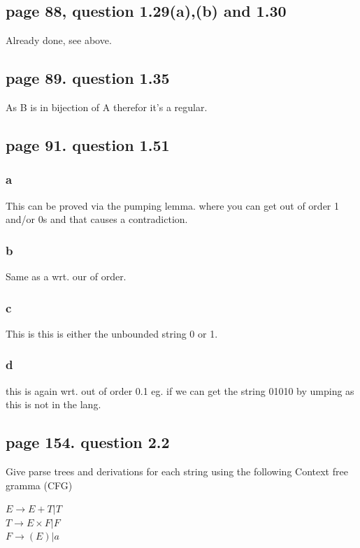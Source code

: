 \documentclass[a4paper,10pt,titlepage]{report}
\begin{document}
\subsection{page 88, question 1.29(a),(b) and 1.30}

Already done, see above.

\subsection{page 89. question 1.35}
As B is in bijection of A therefor it's a regular.


\subsection{page 91. question 1.51}
\begin{multicols}{2}


\subsubsection{a}
This can be proved via the pumping lemma. where you can get out of order 1 and/or 0s and that causes a contradiction.

\subsubsection{b}
Same as a wrt. our of order.

\subsubsection{c}

This is this is either the unbounded string 0 or 1.

\subsubsection{d}
this is again wrt. out of order 0.1 eg. if we can get the string 01010 by umping as this is not in the lang.
\end{multicols}
\subsection{page 154. question 2.2}
Give parse trees and derivations for each string using the following Context free gramma (CFG)  \\
\begin{center}
$ E \rightarrow E+T | T$ \\
$ T \rightarrow E \times F | F $ \\
$ F \rightarrow (E) | a$
\end{center}
\end{document}
